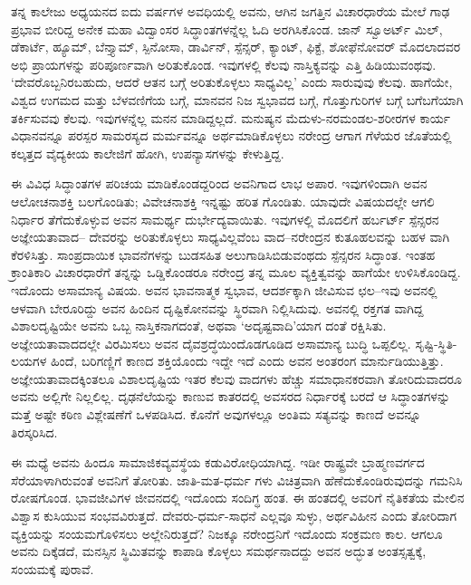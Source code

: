 ತನ್ನ ಕಾಲೇಜು ಅಧ್ಯಯನದ ಐದು ವರ್ಷಗಳ ಅವಧಿಯಲ್ಲಿ ಅವನು, ಆಗಿನ ಜಗತ್ತಿನ ವಿಚಾರಧಾರೆಯ ಮೇಲೆ ಗಾಢ ಪ್ರಭಾವ ಬೀರಿದ್ದ ಅನೇಕ ಮಹಾ ವಿದ್ವಾಂಸರ ಸಿದ್ಧಾಂತಗಳನ್ನೆಲ್ಲ ಓದಿ ಅರಗಿಸಿಕೊಂಡ. ಜಾನ್ ಸ್ವೂಅರ್ಟ್ ಮಿಲ್, ಡೆಕಾರ್ಟೆ, ಹ್ಯೂಮ್, ಬೆನ್ತ್ಯಾಮ್, ಸ್ಪಿನೋಸಾ, ಡಾರ್ವಿನ್, ಸ್ಪೆನ್ಸರ್, ಕ್ಯಾಂಟ್, ಫಿಕ್ಟೆ, ಶೋಫೆನೋವರ್ ಮೊದಲಾದವರ ಅಭಿ ಪ್ರಾಯಗಳನ್ನು ಪರಿಪೂರ್ಣವಾಗಿ ಅರಿತುಕೊಂಡ. ಇವುಗಳಲ್ಲಿ ಕೆಲವು ನಾಸ್ತಿಕ್ಯವನ್ನು ಎತ್ತಿ ಹಿಡಿಯುವಂಥವು. ‘ದೇವರೊಬ್ಬನಿರಬಹುದು, ಆದರೆ ಆತನ ಬಗ್ಗೆ ಅರಿತುಕೊಳ್ಳಲು ಸಾಧ್ಯವಿಲ್ಲ’ ಎಂದು ಸಾರುವುವು ಕೆಲವು. ಹಾಗೆಯೇ, ವಿಶ್ವದ ಉಗಮದ ಮತ್ತು ಬೆಳವಣಿಗೆಯ ಬಗ್ಗೆ, ಮಾನವನ ನಿಜ ಸ್ವಭಾವದ ಬಗ್ಗೆ, ಗೊತ್ತುಗುರಿಗಳ ಬಗ್ಗೆ ಬಗೆಬಗೆಯಾಗಿ ತರ್ಕಿಸುವವು ಕೆಲವು. ಇವುಗಳನ್ನೆಲ್ಲ ಮನನ ಮಾಡಿದ್ದಲ್ಲದೆ. ಮನುಷ್ಯನ ಮೆದುಳು-ನರಮಂಡಲ-ಶರೀರಗಳ ಕಾರ್ಯ ವಿಧಾನವನ್ನೂ ಪರಸ್ಪರ ಸಾಮರಸ್ಯದ ಮರ್ಮವನ್ನೂ ಅರ್ಥಮಾಡಿಕೊಳ್ಳಲು ನರೇಂದ್ರ ಆಗಾಗ ಗೆಳೆಯರ ಜೊತೆಯಲ್ಲಿ ಕಲ್ಕತ್ತದ ವೈದ್ಯಕೀಯ ಕಾಲೇಜಿಗೆ ಹೋಗಿ, ಉಪನ್ಯಾಸಗಳನ್ನು ಕೇಳುತ್ತಿದ್ದ.

ಈ ವಿವಿಧ ಸಿದ್ಧಾಂತಗಳ ಪರಿಚಯ ಮಾಡಿಕೊಂಡದ್ದರಿಂದ ಅವನಿಗಾದ ಲಾಭ ಅಪಾರ. ಇವುಗಳಿಂದಾಗಿ ಅವನ ಆಲೋಚನಾಶಕ್ತಿ ಬಲಗೊಂಡಿತು; ವಿವೇಚನಾಶಕ್ತಿ ಇನ್ನಷ್ಟು ಹರಿತ ಗೊಂಡಿತು. ಯಾವುದೇ ವಿಷಯದಲ್ಲೇ ಆಗಲಿ ನಿರ್ಧಾರ ತೆಗೆದುಕೊಳ್ಳುವ ಅವನ ಸಾಮರ್ಥ್ಯ ದುರ್ಭೇದ್ಯವಾಯಿತು. ಇವುಗಳಲ್ಲಿ ಮೊದಲಿಗೆ ಹರ್ಬರ್ಟ್ ಸ್ಪೆನ್ಸರನ ಅಜ್ಞೇಯತಾವಾದ– ದೇವರನ್ನು ಅರಿತುಕೊಳ್ಳಲು ಸಾಧ್ಯವಿಲ್ಲವೆಂಬ ವಾದ–ನರೇಂದ್ರನ ಕುತೂಹಲವನ್ನು ಬಹಳ ವಾಗಿ ಕೆರಳಿಸಿತ್ತು. ಸಾಂಪ್ರದಾಯಿಕ ಭಾವನೆಗಳನ್ನು ಬುಡಸಹಿತ ಅಲುಗಾಡಿಸಿಬಿಡುವಂಥದು ಸ್ಪೆನ್ಸರನ ಸಿದ್ಧಾಂತ. ಇಂತಹ ಕ್ರಾಂತಿಕಾರಿ ವಿಚಾರಧಾರೆಗೆ ತನ್ನನ್ನು ಒಡ್ಡಿಕೊಂಡರೂ ನರೇಂದ್ರ ತನ್ನ ಮೂಲ ವ್ಯಕ್ತಿತ್ವವನ್ನು ಹಾಗೆಯೇ ಉಳಿಸಿಕೊಂಡಿದ್ದ. ಇದೊಂದು ಅಸಾಮಾನ್ಯ ವಿಷಯ. ಅವನ ಭಾವನಾತ್ಮಕ ಸ್ವಭಾವ, ಆದರ್ಶಕ್ಕಾಗಿ ಜೀವಿಸುವ ಛಲ–ಇವು ಅವನಲ್ಲಿ ಆಳವಾಗಿ ಬೇರೂರಿದ್ದು ಅವನ ಹಿಂದಿನ ದೃಷ್ಟಿಕೋನವನ್ನು ಸ್ಥಿರವಾಗಿ ನಿಲ್ಲಿಸಿದುವು. ಅವನಲ್ಲಿ ರಕ್ತಗತ ವಾಗಿದ್ದ ವಿಶಾಲದೃಷ್ಟಿಯೇ ಅವನು ಒಬ್ಬ ನಾಸ್ತಿಕನಾಗದಂತೆ, ಅಥವಾ ‘ಅದೃಷ್ಟವಾದಿ’ಯಾಗ ದಂತೆ ರಕ್ಷಿಸಿತು. ಅಜ್ಞೇಯತಾವಾದದಲ್ಲೇ ವಿರಮಿಸಲು ಅವನ ದೈವಶ್ರದ್ಧೆಯಿಂದೊಡಗೂಡಿದ ಅಸಾಮಾನ್ಯ ಬುದ್ಧಿ ಒಪ್ಪಲಿಲ್ಲ. ಸೃಷ್ಟಿ-ಸ್ಥಿತಿ-ಲಯಗಳ ಹಿಂದೆ, ಬರಿಗಣ್ಣಿಗೆ ಕಾಣದ ಶಕ್ತಿಯೊಂದು ಇದ್ದೇ ಇದೆ ಎಂದು ಅವನ ಅಂತರಂಗ ಮಾರ್ನುಡಿಯುತ್ತಿತ್ತು. ಅಜ್ಞೇಯತಾವಾದಕ್ಕಿಂತಲೂ ವಿಶಾಲದೃಷ್ಟಿಯ ಇತರ ಕೆಲವು ವಾದಗಳು ಹೆಚ್ಚು ಸಮಾಧಾನಕರವಾಗಿ ತೋರಿದುವಾದರೂ ಅವನು ಅಲ್ಲಿಗೇ ನಿಲ್ಲಲಿಲ್ಲ. ದೃಢನೆಲೆಯನ್ನು ಕಾಣುವ ಕಾತರದಲ್ಲಿ ಅವಸರದ ನಿರ್ಧಾರಕ್ಕೆ ಬರದೆ ಆ ಸಿದ್ಧಾಂತಗಳನ್ನು ಮತ್ತೆ ಅಷ್ಟೇ ಕಠಿಣ ವಿಶ್ಲೇಷಣೆಗೆ ಒಳಪಡಿಸಿದ. ಕೊನೆಗೆ ಅವುಗಳಲ್ಲೂ ಅಂತಿಮ ಸತ್ಯವನ್ನು ಕಾಣದೆ ಅವನ್ನೂ ತಿರಸ್ಕರಿಸಿದ.

ಈ ಮಧ್ಯೆ ಅವನು ಹಿಂದೂ ಸಾಮಾಜಿಕವ್ಯವಸ್ಥೆಯ ಕಡುವಿರೋಧಿಯಾಗಿದ್ದ. ಇಡೀ ರಾಷ್ಟ್ರವೇ ಬ್ರಾಹ್ಮಣವರ್ಗದ ಸೆರೆಯಾಳಾಗಿರುವಂತೆ ಅವನಿಗೆ ತೋರಿತು. ಜಾತಿ-ಮತ-ಧರ್ಮ ಗಳು ವಿಚಿತ್ರವಾಗಿ ಹೆಣೆದುಕೊಂಡಿರುವುದನ್ನು ಗಮನಿಸಿ ರೋಷಗೊಂಡ. ಭಾವಜೀವಿಗಳ ಜೀವನದಲ್ಲಿ ಇದೊಂದು ಸಂದಿಗ್ಧ ಹಂತ. ಈ ಹಂತದಲ್ಲಿ ಅವರಿಗೆ ನೈತಿಕತೆಯ ಮೇಲಿನ ವಿಶ್ವಾಸ ಕುಸಿಯುವ ಸಂಭವವಿರುತ್ತದೆ. ದೇವರು-ಧರ್ಮ-ಸಾಧನೆ ಎಲ್ಲವೂ ಸುಳ್ಳು, ಅರ್ಥವಿಹೀನ ಎಂದು ತೋರಿದಾಗ ವ್ಯಕ್ತಿಯನ್ನು ಸಂಯಮಗೊಳಿಸಲು ಅಲ್ಲೇನಿರುತ್ತದೆ? ನಿಜಕ್ಕೂ ನರೇಂದ್ರನಿಗೆ ಇದೊಂದು ಸಂಕ್ರಮಣ ಕಾಲ. ಆಗಲೂ ಅವನು ದಿಕ್ಕೆಡದೆ, ಮನಸ್ಸಿನ ಸ್ಥಿಮಿತವನ್ನು ಕಾಪಾಡಿ ಕೊಳ್ಳಲು ಸಮರ್ಥನಾದದ್ದು ಅವನ ಅದ್ಭುತ ಅಂತಸ್ಸತ್ವಕ್ಕೆ, ಸಂಯಮಕ್ಕೆ ಪುರಾವೆ.

